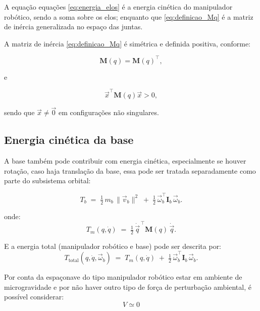 A equação equações \eqref{eq:energia_elos} é a energia cinética do manipulador robótico, sendo a soma sobre os elos; enquanto que \eqref{eq:definicao_Mq} é a matriz de inércia generalizada no espaço das juntas.

A matriz de inércia \eqref{eq:definicao_Mq} é simétrica e definida positiva, conforme:

\begin{equation}
 \mathbf M(q)=\mathbf M(q)^{\top},
\end{equation}

e

\begin{equation}
    \vec x^{\top}\mathbf M(q)\vec x>0,
\end{equation}

sendo que $\vec x\neq \vec 0$ em configurações não singulares.

\subsection{Energia cinética da base}
A base também pode contribuir com energia cinética, especialmente se houver rotação, caso haja translação da base, essa pode ser tratada separadamente como parte do subsistema orbital:

\begin{equation}
T_b \;=\; \tfrac12\,m_b\,\|\vec v_b\|^2 \;+\; \tfrac12\,\vec\omega_b^{\top}\mathbf I_b\,\vec\omega_b.
\end{equation}

onde:
\begin{equation}
\label{eq:T_classica} %
T_m(q,\dot q) \;=\; \tfrac12\,\dot{\vec q}^{\,\top}\mathbf M(q)\,\dot{\vec q}.
\end{equation}

E a energia total (manipulador robótico e base) pode ser descrita por:
\begin{equation}
T_{\text{total}}(q,\dot q,\vec\omega_b) \;=\; T_m(q,\dot q) \;+\; \tfrac12\,\vec\omega_b^{\top}\mathbf I_b\,\vec\omega_b.
\end{equation}

Por conta da espaçonave do tipo manipulador robótico estar em ambiente de microgravidade e por não haver outro tipo de força de perturbação ambiental, é possível considerar:
\begin{equation}
V \simeq 0
\end{equation}

